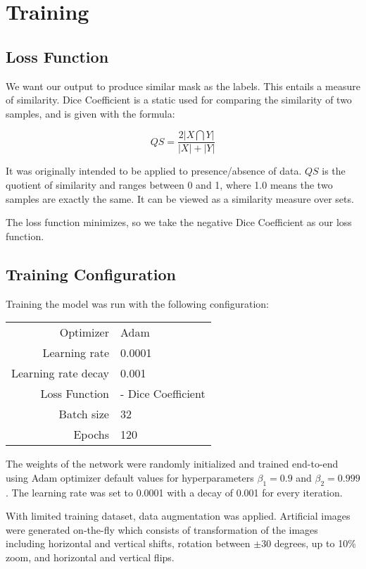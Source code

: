 \section{Training}
\subsection{Loss Function}
We want our output to produce similar mask as the labels. This entails a measure of similarity. Dice Coefficient \cite{Sorensen-1948-BK} is a static used for comparing the similarity of two samples, and is given with the formula:

$$QS=\frac{2|X\bigcap Y|}{|X| + |Y|}$$

It was originally intended to be applied to presence/absence of data. ${QS}$ is the quotient of similarity and ranges between 0 and 1, where 1.0 means the two samples are exactly the same. It can be viewed as a similarity measure over sets.

The loss function minimizes, so we take the negative Dice Coefficient as our loss function.

\subsection{Training Configuration}
Training the model was run with the following configuration:

\begin{center}
\begin{tabular}{r l}
	Optimizer           & Adam \\
	Learning rate       & 0.0001 \\
	Learning rate decay & 0.001 \\
	Loss Function       & - Dice Coefficient \\
	Batch size          & 32 \\
	Epochs              & 120
\end{tabular}
\end{center}

The weights of the network were randomly initialized and trained end-to-end using Adam optimizer \cite{2014arXiv1412.6980K} default values for hyperparameters $\beta_1=0.9$ and $\beta_2=0.999$. The learning rate was set to 0.0001 with a decay of 0.001 for every iteration.

With limited training dataset, data augmentation was applied. Artificial images were generated on-the-fly which consists of transformation of the images including horizontal and vertical shifts, rotation between $\pm30$ degrees, up to 10\% zoom, and horizontal and vertical flips.

